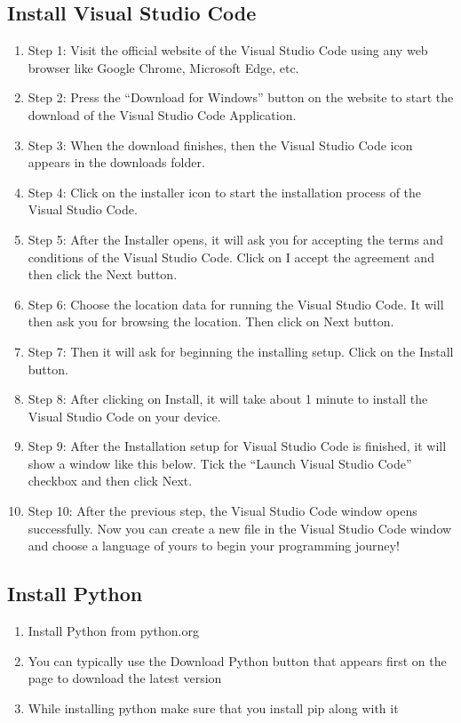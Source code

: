 \documentclass[12 pt, oneside]{book}
\begin{document}
\subsection{Install Visual Studio Code}
\begin{enumerate}
    \item Step 1: Visit the official website of the Visual Studio Code using any web browser like Google Chrome, Microsoft Edge, etc.
\item Step 2: Press the “Download for Windows” button on the website to start the download of the Visual Studio Code Application.
\item Step 3: When the download finishes, then the Visual Studio Code icon appears in the downloads folder.
\item Step 4: Click on the installer icon to start the installation process of the Visual Studio Code.
\item Step 5: After the Installer opens, it will ask you for accepting the terms and conditions of the Visual Studio Code. Click on I accept the agreement and then click the Next button.
\item Step 6: Choose the location data for running the Visual Studio Code. It will then ask you for browsing the location. Then click on Next button.
\item Step 7: Then it will ask for beginning the installing setup. Click on the Install button.
\item Step 8: After clicking on Install, it will take about 1 minute to install the Visual Studio Code on your device.
\item Step 9: After the Installation setup for Visual Studio Code is finished, it will show a window like this below. Tick the “Launch Visual Studio Code” checkbox and then click Next.
\item Step 10: After the previous step, the Visual Studio Code window opens successfully. Now you can create a new file in the Visual Studio Code window and choose a language of yours to begin your programming journey!
\end{enumerate}

\subsection{Install Python}
\begin{enumerate}
\item Install Python from python.org
\item You can typically use the Download Python button that appears first on the page to download the latest version
\item While installing python make sure that you install pip along with it
\end{enumerate}
\end{document}
